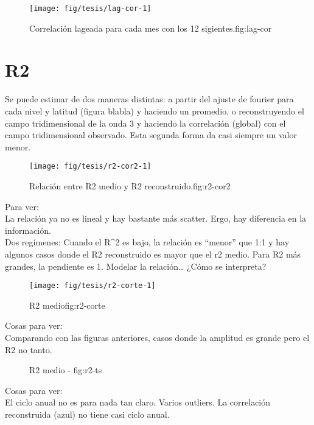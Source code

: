 \documentclass[spanish,a4paper]{book}
\begin{document}
\begin{figure}
\texttt{[image: fig/tesis/lag-cor-1]} \caption{Correlación lageada para cada mes con los 12 sigientes.{fig:lag-cor}}\label{fig:lag-cor}
\end{figure}

\section{R2}\label{r2}

Se puede estimar de dos maneras distintas: a partir del ajuste de
fourier para cada nivel y latitud (figura blabla) y haciendo un
promedio, o reconstruyendo el campo tridimensional de la onda 3 y
haciendo la correlación (global) con el campo tridimensional observado.
Esta segunda forma da casi siempre un valor menor.

\begin{figure}
\texttt{[image: fig/tesis/r2-cor2-1]} \caption{Relación entre R2 medio y R2 reconstruido.{fig:r2-cor2}}\label{fig:r2-cor2}
\end{figure}

Para ver:\\
La relación ya no es lineal y hay bastante más scatter. Ergo, hay
diferencia en la información.\\
Dos regímenes: Cuando el R\^{}2 es bajo, la relación es ``menor'' que
1:1 y hay algunos casos donde el R2 reconstruido es mayor que el r2
medio. Para R2 más grandes, la pendiente es 1. Modelar la
relación\ldots{} ¿Cómo se interpreta?

\begin{figure*}
\texttt{[image: fig/tesis/r2-corte-1]} \caption{R2 medio{fig:r2-corte}}\label{fig:r2-corte}
\end{figure*}

Cosas para ver:\\
Comparando con las figuras anteriores, casos donde la amplitud es grande
pero el R2 no tanto.

\begin{figure*}
\newline{}\caption{R2 medio - fig:r2-ts}\label{fig:r2-ts}
\end{figure*}

Cosas para ver:\\
El ciclo anual no es para nada tan claro. Varios outliers. La
correlación reconstruida (azul) no tiene casi ciclo anual.
\end{document}
